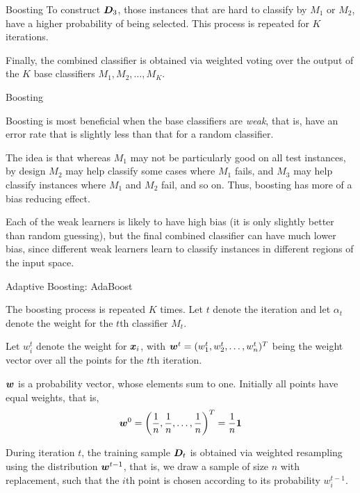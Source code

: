{\begin{frame}{Boosting}
\medskip
To construct
${\boldsymbol D}_3$, those instances that are hard to classify by $M_1$ or $M_2$,
have a higher probability of being selected.
This process is repeated
for $K$ iterations. 

\medskip
F{i}nally, the combined classif\/{i}er
is obtained via weighted voting over the output of the $K$ base
classif\/{i}ers $M_1, M_2, \ldots, M_K$.
\end{frame}


\begin{frame}{Boosting}

  Boosting is most benef\/{i}cial when the base classif\/{i}ers are {\em
weak}, that is, have an error rate that is slightly less than that
for a random classif\/{i}er. 

\medskip
The idea is that whereas $M_1$ may not be
particularly good on all test instances, by design $M_2$ may help
classify some cases where $M_1$ fails, and $M_3$ may help classify
instances where
 $M_1$ and $M_2$ fail, and so on. Thus,
boosting has more of a bias reducing effect. 

\medskip
Each of the weak learners
is likely to have high bias (it is only slightly better than random
guessing), but the f\/{i}nal combined classif\/{i}er can have much lower bias,
since different weak learners learn to classify instances in
different regions of the input space.
\end{frame}



\begin{frame}{Adaptive Boosting: AdaBoost}

The boosting process is repeated $K$ times.
Let $t$ denote the iteration and let $\alpha_t$ denote the weight
for the $t$th classif\/{i}er $M_t$. 

\medskip
Let $w^t_i$ denote the weight for
${\boldsymbol x}_i$, with ${\boldsymbol w}^t = (w^t_1, w^t_2, \ldots, w^t_n)^T$ being the
weight vector over all the points for the $t$th iteration. 

\medskip
${\boldsymbol w}$ is a probability vector, whose elements sum to one.
Initially all points have equal weights, that is,
\begin{align*}
  {\boldsymbol w}^0 = \left(\frac{1}{n}, \frac{1}{n}, \ldots, \frac{1}{n}\right)^T =
  \frac{1}{n}\mathbf{1}
\end{align*}


\medskip
During iteration $t$, the
training sample ${\boldsymbol D}_{t}$ is obtained via weighted resampling
using the distribution ${\boldsymbol w}^{t-1}$, that is, we draw a sample of
size $n$ with replacement, such that the $i$th point is chosen
according to its probability $w^{t-1}_i$. 


\end{frame}}
